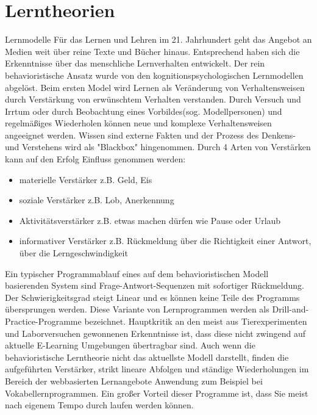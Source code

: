 \documentclass[a4paper, 12pt, twoside, BCOR=20mm, DIV=calc, abstracton, parskip=half*, toc=bibliography, toc=listof, headsepline, footsepline, headings=small, numbers=enddot]{scrreprt}
\begin{document}
	\section{Lerntheorien}
	{Lernmodelle}\newline
	Für das Lernen und Lehren im 21. Jahrhundert geht das Angebot an Medien weit über reine Texte und Bücher hinaus. Entsprechend haben sich die Erkenntnisse über das menschliche Lernverhalten entwickelt. Der rein behavioristische Ansatz \cite[John Watson/ B.F.Skinner]{baumgart1998entwicklungs} wurde von den kognitionspsychologischen Lernmodellen \cite[S.102]{arnold2013handbuch}abgelöst. Beim ersten Model wird Lernen als Veränderung von Verhaltensweisen durch Verstärkung von erwünschtem Verhalten verstanden. Durch Versuch und Irrtum oder durch Beobachtung eines Vorbildes(sog. Modellpersonen) und regelmäßiges Wiederholen können neue und komplexe Verhaltensweisen angeeignet werden\cite[S.101 Skinner]{arnold2013handbuch}. Wissen sind externe Fakten und der Prozess des Denkens- und Verstehens wird als "Blackbox" hingenommen. 
	Durch 4 Arten von Verstärken kann auf den Erfolg Einfluss genommen werden: 
	\begin{itemize}
		\item materielle Verstärker z.B. Geld, Eis
		\item soziale Verstärker z.B. Lob, Anerkennung
		\item Aktivitätsverstärker z.B. etwas machen dürfen wie Pause oder Urlaub
		\item informativer Verstärker z.B. Rückmeldung über die Richtigkeit einer Antwort, über die Lerngeschwindigkeit
	\end{itemize}\cite[S.21]{issing2009online}
	Ein typischer Programmablauf eines auf dem behavioristischen Modell basierenden System sind Frage-Antwort-Sequenzen mit sofortiger Rückmeldung. Der Schwierigkeitsgrad steigt Linear und es können keine Teile des Programms übersprungen werden. Diese Variante von Lernprogrammen werden als Drill-and-Practice-Programme bezeichnet. Hauptkritik an den meist aus Tierexperimenten und Laborversuchen gewonnenen Erkenntnisse ist, dass diese nicht zwingend auf aktuelle E-Learning Umgebungen übertragbar sind.
	Auch wenn die behavioristische Lerntheorie nicht das aktuellste Modell darstellt, finden die aufgeführten Verstärker, strikt lineare Abfolgen und ständige Wiederholungen im Bereich der webbasierten Lernangebote Anwendung zum Beispiel bei Vokabellernprogrammen. Ein großer Vorteil dieser Programme ist, dass Sie meist nach eigenem Tempo durch laufen werden können\cite[65 ff.]{niegemann2005}. 
	
\end{document}
